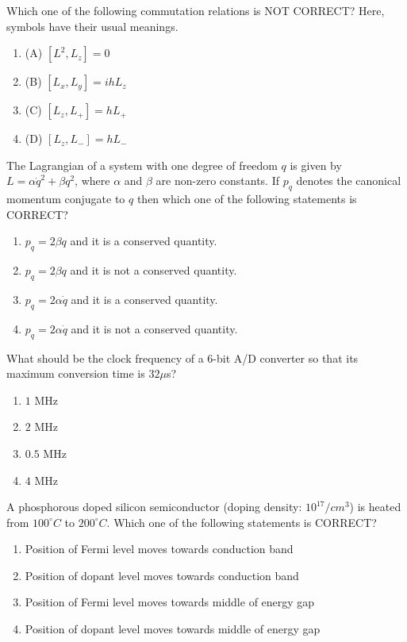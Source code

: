 \item Which one of the following commutation relations is NOT CORRECT? Here, symbols have their usual meanings.
\begin{enumerate}
    \item (A) $[L^2, L_z] = 0$
    \item (B) $[L_x, L_y] = ihL_z$
    \item (C) $[L_z, L_+] = hL_+$
    \item (D) $[L_z, L_-] = hL_-$
\end{enumerate}
\item The Lagrangian of a system with one degree of freedom $q$ is given by $L = \alpha \dot{q}^2 + \beta q^2$, where $\alpha$ and $\beta$ are non-zero constants. If $p_q$ denotes the canonical momentum conjugate to $q$ then which one of the following statements is CORRECT?
\begin{enumerate}
    \item $p_q = 2\beta q$ \quad and it is a conserved quantity.
    \item $p_q = 2\beta q$ \quad and it is not a conserved quantity.
    \item $p_q = 2\alpha \dot{q}$ \quad and it is a conserved quantity.
    \item $p_q = 2\alpha \dot{q}$ \quad and it is not a conserved quantity.
\end{enumerate} 
\item What should be the clock frequency of a $6$-bit A/D converter so that its maximum conversion time is $32 \mu$s?
\begin{multicols}{4}
\begin{enumerate}
    \item  $1$ MHz
    \item  $2$ MHz
    \item  $0.5$ MHz
    \item  $4$ MHz
\end{enumerate}
\end{multicols}

\item A phosphorous doped silicon semiconductor (doping density: $10^{17}/cm^3$) is heated from $100^\circ C$ to $200^\circ C$. Which one of the following statements is CORRECT? 

\begin{enumerate}
    \item Position of Fermi level moves towards conduction band
    \item Position of dopant level moves towards conduction band
    \item Position of Fermi level moves towards middle of energy gap
    \item Position of dopant level moves towards middle of energy gap
\end{enumerate}


